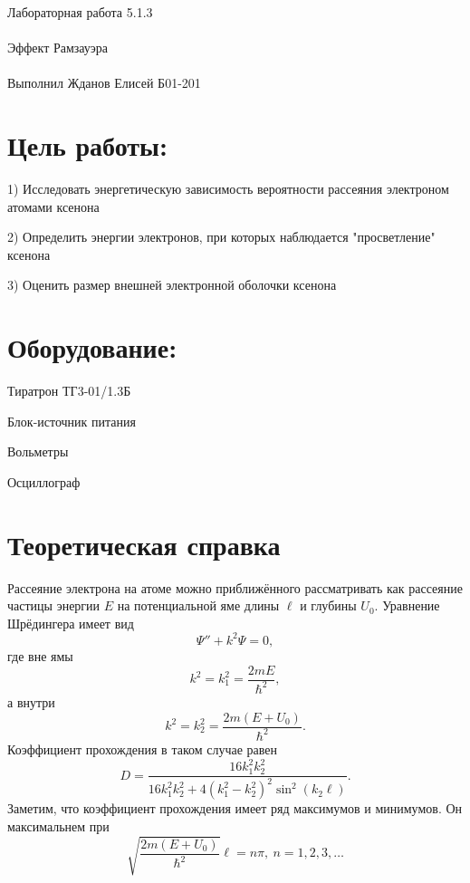 \documentclass{astroedu-lab}
\begin{document}
\pagestyle{plain}

\begin{problem}{\huge Лабораторная работа 5.1.3\\\\Эффект Рамзауэра\\\\Выполнил Жданов Елисей Б01-201}

\section{Цель работы:}

1) Исследовать энергетическую зависимость вероятности рассеяния электроном атомами ксенона

2) Определить энергии электронов, при которых наблюдается "просветление" ксенона

3) Оценить размер внешней электронной оболочки ксенона

\section{Оборудование:}

Тиратрон ТГ3-01/1.3Б

Блок-источник питания

Вольметры

Осциллограф

\section{Теоретическая справка}

Рассеяние электрона на атоме можно приближённого рассматривать как рассеяние частицы энергии $E$ на потенциальной яме длины $\ell$ и глубины $U_0$. Уравнение Шрёдингера имеет вид
\[\Psi'' + k^2 \Psi = 0,\]
где вне ямы 
\[k^2 = k_1^2 = \dfrac{2mE}{\hbar^2},\]
а внутри 
\[k^2 = k_2^2 = \dfrac{2m(E+U_0)}{\hbar^2}.\]
Коэффициент прохождения в таком случае равен
\[D = \dfrac{16 k_1^2 k_2^2}{16k_1^2 k_2^2 + 4(k_1^2 - k_2^2)^2\sin^2(k_2\ell)}.\]
Заметим, что коэффициент прохождения имеет ряд максимумов и минимумов. Он максимальнем при
\begin{equation}\label{0}
\sqrt{\dfrac{2m(E+U_0)}{\hbar^2}}\ell = n\pi,~n=1,2,3,\dots
\end{equation}


\end{problem}
\end{document}
